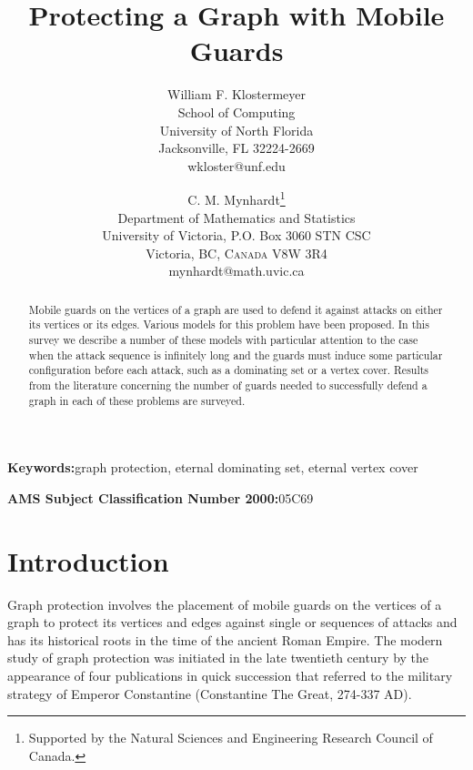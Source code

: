 \documentclass[12pt]{article}%
\begin{document}
\title{\textbf{Protecting a Graph with Mobile Guards}}
\author{William F. Klostermeyer\\School of Computing\\University of North Florida\\Jacksonville, FL 32224-2669\\{\small wkloster@unf.edu}
\and C. M. Mynhardt\thanks{Supported by the Natural Sciences and Engineering
Research Council of Canada.}\\Department of Mathematics and Statistics\\University of Victoria, P.O. Box 3060 STN CSC\\Victoria, BC, \textsc{Canada} V8W 3R4\\{\small mynhardt@math.uvic.ca}}
\maketitle

\begin{abstract}
Mobile guards on the vertices of a graph are used to defend it against attacks
on either its vertices or its edges. Various models for this problem have been
proposed. In this survey we describe a number of these models with particular
attention to the case when the attack sequence is infinitely long and the
guards must induce some particular configuration before each attack, such as a
dominating set or a vertex cover. Results from the literature concerning the
number of guards needed to successfully defend a graph in each of these
problems are surveyed.

\end{abstract}

\noindent\textbf{Keywords:\hspace{0.1in}}graph protection, eternal dominating
set, eternal vertex cover

\noindent\textbf{AMS Subject Classification Number 2000:\hspace{0.1in}}05C69

\section{Introduction}

Graph protection involves the placement of mobile guards on the vertices of a
graph to protect its vertices and edges against single or sequences of attacks
and has its historical roots in the time of the ancient Roman Empire. The
modern study of graph protection was initiated in the late twentieth century
by the appearance of four publications in quick succession that referred to
the military strategy of Emperor Constantine (Constantine The Great, 274-337 AD).
\end{document}
